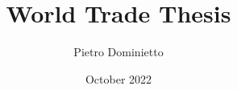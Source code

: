 \documentclass[a4paper,12pt]{report}
\title{World Trade Thesis}
\author{Pietro Dominietto}
\date{October 2022}
\begin{document}
\maketitle



\tableofcontents

\listoftables
\listoffigures
\pagebreak







% 
\printbibliography

\appendix

\end{document}
